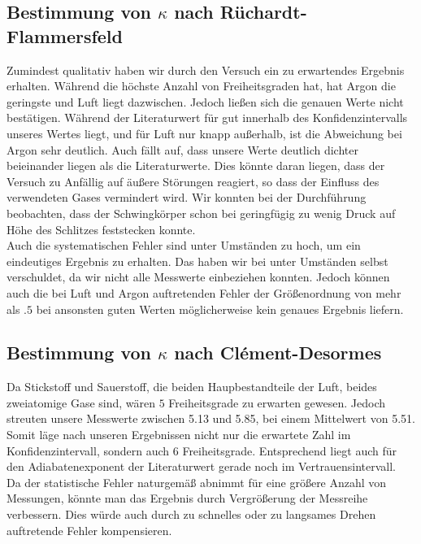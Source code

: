 \subsection{Bestimmung von $ \kappa $ nach Rüchardt-Flammersfeld}
Zumindest qualitativ haben wir durch den Versuch ein zu erwartendes Ergebnis erhalten. Während  die höchste Anzahl von Freiheitsgraden hat, hat Argon die geringste und Luft liegt dazwischen. Jedoch ließen sich die genauen Werte nicht bestätigen.
Während der Literaturwert für \coz gut innerhalb des Konfidenzintervalls unseres Wertes liegt, und für Luft nur knapp außerhalb, ist die Abweichung bei Argon sehr deutlich. Auch fällt auf, dass unsere Werte deutlich dichter beieinander liegen als die Literaturwerte. Dies könnte daran liegen, dass der Versuch zu Anfällig auf äußere Störungen reagiert, so dass der Einfluss des verwendeten Gases vermindert wird. Wir konnten bei der Durchführung beobachten, dass der Schwingkörper schon bei geringfügig zu wenig Druck auf Höhe des Schlitzes feststecken konnte. \\
Auch die systematischen Fehler sind unter Umständen zu hoch, um ein eindeutiges Ergebnis zu erhalten. Das haben wir bei \coz unter Umständen selbst verschuldet, da wir nicht alle Messwerte einbeziehen konnten. Jedoch können auch die bei Luft und Argon auftretenden Fehler der Größenordnung von mehr als $ \num{.5} $ bei ansonsten guten Werten möglicherweise kein genaues Ergebnis liefern. 

\subsection{Bestimmung von $ \kappa $ nach Clément-Desormes}
Da Stickstoff und Sauerstoff, die beiden Haupbestandteile der Luft, beides zweiatomige Gase sind, wären $ 5 $ Freiheitsgrade zu erwarten gewesen. Jedoch streuten unsere Messwerte zwischen \num{5.13} und \num{5.85}, bei einem Mittelwert von \num{5.51}. Somit läge nach unseren Ergebnissen nicht nur die erwartete Zahl im Konfidenzintervall, sondern auch \num{6} Freiheitsgrade. Entsprechend liegt auch für den Adiabatenexponent der Literaturwert gerade noch im Vertrauensintervall.\\
Da der statistische Fehler naturgemäß abnimmt für eine größere Anzahl von Messungen, könnte man das Ergebnis durch Vergrößerung der Messreihe verbessern. Dies würde auch durch zu schnelles oder zu langsames Drehen auftretende Fehler kompensieren.
